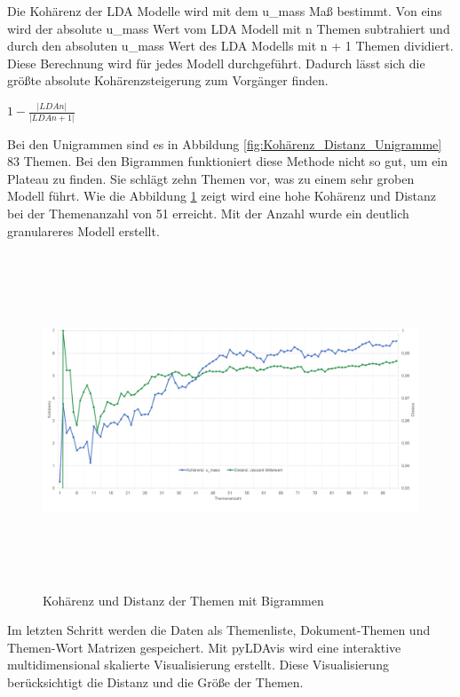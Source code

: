 Die Kohärenz der LDA Modelle wird mit dem u\_mass Maß bestimmt. Von eins wird der absolute u\_mass Wert vom LDA Modell mit n Themen subtrahiert und durch den absoluten u\_mass Wert des LDA Modells mit n + 1 Themen dividiert. Diese Berechnung wird für jedes Modell durchgeführt. Dadurch lässt sich die größte absolute Kohärenzsteigerung zum Vorgänger finden.

\begin{center}
	$1-\frac{\left|LDA n\right|}{\left|LDA n + 1\right|}$ 
\end{center}


Bei den Unigrammen sind es in Abbildung \ref{fig:Kohärenz_Distanz_Unigramme} 83 Themen. Bei den Bigrammen funktioniert diese Methode nicht so gut, um ein Plateau zu finden. Sie schlägt zehn Themen vor, was zu einem sehr groben Modell führt. Wie die Abbildung \ref{fig:Kohärenz_Distanz_Bigramme} zeigt wird eine hohe Kohärenz und Distanz bei der Themenanzahl von 51 erreicht. Mit der Anzahl wurde ein deutlich granulareres Modell erstellt. 

\begin{figure}[htpb]
	\centering
	\includegraphics[width=\textwidth,height=10cm,keepaspectratio=true]{img/coherenceAndDistanceBigram.png}
	\caption{
		Kohärenz und Distanz der Themen mit Bigrammen
	}
	\label{fig:Kohärenz_Distanz_Bigramme}
\end{figure}


 

Im letzten Schritt werden die Daten als Themenliste, Dokument-Themen und Themen-Wort Matrizen gespeichert. Mit  pyLDAvis wird eine interaktive multidimensional skalierte Visualisierung erstellt. Diese Visualisierung berücksichtigt die Distanz und die Größe der Themen.


